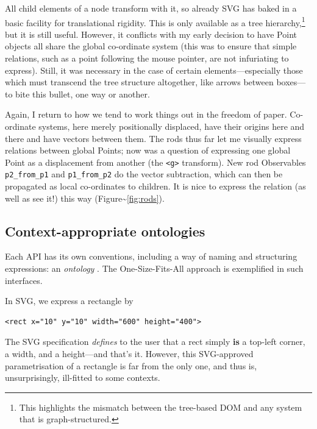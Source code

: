 All child elements of a node transform with it, so already SVG has baked
in a basic facility for translational rigidity. This is only available
as a tree hierarchy,\footnote{This highlights the mismatch between the
  tree-based DOM and any system that is graph-structured.} but it is
still useful. However, it conflicts with my early decision to have Point
objects all share the global co-ordinate system (this was to ensure that
simple relations, such as a point following the mouse pointer, are not
infuriating to express). Still, it was necessary in the case of certain
elements---especially those which must transcend the tree structure
altogether, like arrows between boxes---to bite this bullet, one way or
another.

Again, I return to how we tend to work things out in the freedom of
paper. Co-ordinate systems, here merely positionally displaced, have
their origins here and there and have vectors between them. The rods
thus far let me visually express relations between global Points; now
was a question of expressing one global Point as a displacement from
another (the \texttt{\textless{}g\textgreater{}} transform). New rod
Observables \texttt{p2\_from\_p1} and \texttt{p1\_from\_p2} do the
vector subtraction, which can then be propagated as local co-ordinates
to children. It is nice to express the relation (as well as see it!)
this way (Figure\textasciitilde{}\ref{fig:rods}).

\hypertarget{context-appropriate-ontologies}{%
\subsection{Context-appropriate
ontologies}\label{context-appropriate-ontologies}}

Each API has its own conventions, including a way of naming and
structuring expressions: an \emph{ontology} \cite{crit-semprola}. The
One-Size-Fits-All{} approach is exemplified in such interfaces.

In SVG, we express a rectangle by

\begin{lstlisting}
<rect x="10" y="10" width="600" height="400">
\end{lstlisting}

The SVG specification \emph{defines} to the user that a rect simply
\textbf{is} a top-left corner, a width, and a height---and that's it.
However, this SVG-approved parametrisation of a rectangle is far from
the only one, and thus is, unsurprisingly, ill-fitted to some contexts.

